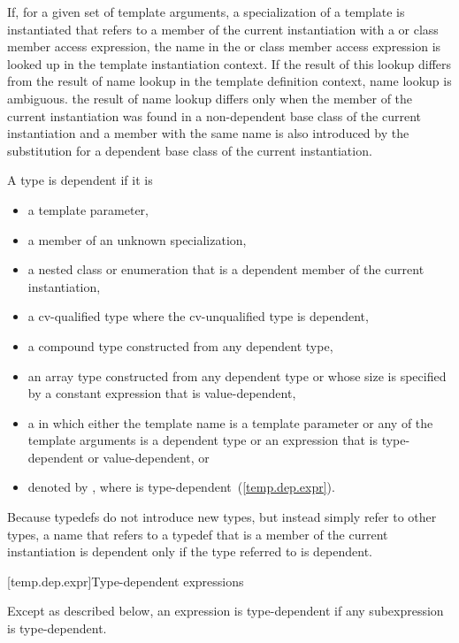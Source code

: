 \pnum
If, for a given set of template arguments, a specialization of a template is
instantiated that refers to a member of the current instantiation with a
 or class member access expression, the name in the
 or class member access expression is looked up in the
template instantiation context. If the result of this lookup differs from the
result of name lookup in the template definition context, name lookup is
ambiguous. \enternote the result of name lookup differs only when the member of
the current instantiation was found in a non-dependent base class of the current
instantiation and a member with the same name is also introduced by the
substitution for a dependent base class of the current instantiation. \exitnote

\pnum
A type is dependent if it is
\begin{itemize}
\item
a template parameter,
\item
a member of an unknown specialization,
\item
a nested class or enumeration that is a dependent member of the current
instantiation,
\item
a cv-qualified type where the cv-unqualified type is dependent,
\item
a compound type constructed from any dependent type,
\item
an array type constructed from any dependent type or whose
size is specified by a constant expression that is value-dependent,
\item
a
in which either the template name is a template parameter or any of the
template arguments is a dependent type or an expression that is type-dependent
or value-dependent, or
\item denoted by \tcode{)},
where  is type-dependent~(\ref{temp.dep.expr}).
\end{itemize}

\pnum
\enternote
Because typedefs do not introduce new types, but
instead simply refer to other types, a name that refers to a
typedef that is a member of the current instantiation is dependent
only if the type referred to is dependent.
\exitnote

[temp.dep.expr]{Type-dependent expressions}

\pnum
Except as described below, an expression is type-dependent if any
subexpression is type-dependent.

